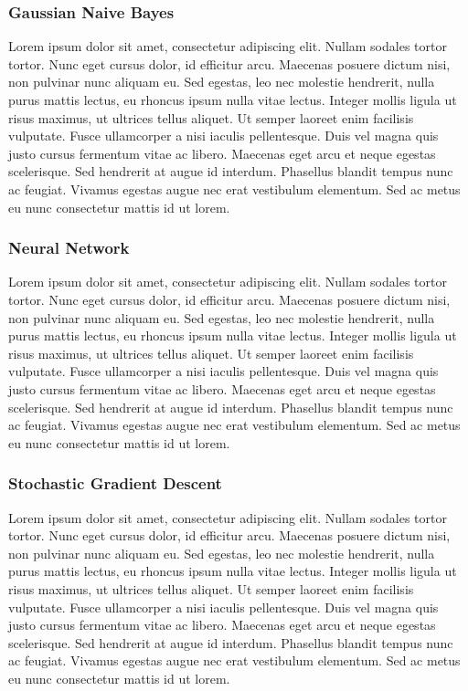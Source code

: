 \subsubsection{Gaussian Naive Bayes}
Lorem ipsum dolor sit amet, consectetur adipiscing elit. Nullam sodales tortor tortor. Nunc eget cursus dolor, id efficitur arcu. Maecenas posuere dictum nisi, non pulvinar nunc aliquam eu. Sed egestas, leo nec molestie hendrerit, nulla purus mattis lectus, eu rhoncus ipsum nulla vitae lectus. Integer mollis ligula ut risus maximus, ut ultrices tellus aliquet. Ut semper laoreet enim facilisis vulputate. Fusce ullamcorper a nisi iaculis pellentesque. Duis vel magna quis justo cursus fermentum vitae ac libero. Maecenas eget arcu et neque egestas scelerisque. Sed hendrerit at augue id interdum. Phasellus blandit tempus nunc ac feugiat. Vivamus egestas augue nec erat vestibulum elementum. Sed ac metus eu nunc consectetur mattis id ut lorem.

\subsubsection{Neural Network}
Lorem ipsum dolor sit amet, consectetur adipiscing elit. Nullam sodales tortor tortor. Nunc eget cursus dolor, id efficitur arcu. Maecenas posuere dictum nisi, non pulvinar nunc aliquam eu. Sed egestas, leo nec molestie hendrerit, nulla purus mattis lectus, eu rhoncus ipsum nulla vitae lectus. Integer mollis ligula ut risus maximus, ut ultrices tellus aliquet. Ut semper laoreet enim facilisis vulputate. Fusce ullamcorper a nisi iaculis pellentesque. Duis vel magna quis justo cursus fermentum vitae ac libero. Maecenas eget arcu et neque egestas scelerisque. Sed hendrerit at augue id interdum. Phasellus blandit tempus nunc ac feugiat. Vivamus egestas augue nec erat vestibulum elementum. Sed ac metus eu nunc consectetur mattis id ut lorem.

\subsubsection{Stochastic Gradient Descent}
Lorem ipsum dolor sit amet, consectetur adipiscing elit. Nullam sodales tortor tortor. Nunc eget cursus dolor, id efficitur arcu. Maecenas posuere dictum nisi, non pulvinar nunc aliquam eu. Sed egestas, leo nec molestie hendrerit, nulla purus mattis lectus, eu rhoncus ipsum nulla vitae lectus. Integer mollis ligula ut risus maximus, ut ultrices tellus aliquet. Ut semper laoreet enim facilisis vulputate. Fusce ullamcorper a nisi iaculis pellentesque. Duis vel magna quis justo cursus fermentum vitae ac libero. Maecenas eget arcu et neque egestas scelerisque. Sed hendrerit at augue id interdum. Phasellus blandit tempus nunc ac feugiat. Vivamus egestas augue nec erat vestibulum elementum. Sed ac metus eu nunc consectetur mattis id ut lorem.

